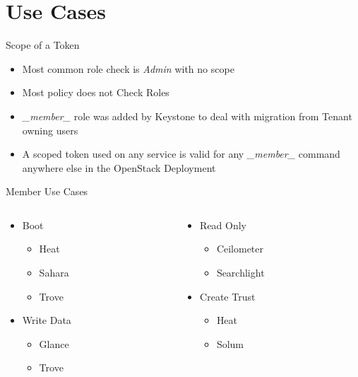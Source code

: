 \documentclass{beamer}
\begin{document}
\section {Use Cases}

\begin{frame}{Scope of a Token}
  \begin{itemize}
  \item Most common role check is \textit{Admin} with no scope
  \item Most policy does not Check Roles
  \item  \textit{\_member\_ } role was added by Keystone to deal with migration from Tenant owning users
    \item A scoped token used on any service is valid for any \textit{\_member\_ } command anywhere else in the OpenStack Deployment
  \end{itemize}
\end{frame}





\begin{frame}{Member Use Cases}
  \begin{columns}[t,onlytextwidth]

    \begin{column}{.5\textwidth}
      \begin{itemize}
      \item Boot
        \begin{itemize}
        \item Heat
        \item Sahara
        \item Trove
        \end{itemize}
      \item Write Data
        \begin{itemize}
        \item Glance
        \item Trove
        \end{itemize}

      \end{itemize}
    \end{column}


    \begin{column}{.5\textwidth}
      \begin{itemize}
      \item Read Only
        \begin{itemize}
        \item Ceilometer
        \item Searchlight
        \end{itemize}

      \item Create Trust
        \begin{itemize}
        \item Heat
        \item Solum
        \end{itemize}
      \end{itemize}
    \end{column}
  \end{columns}
\end{frame}
\end{document}
